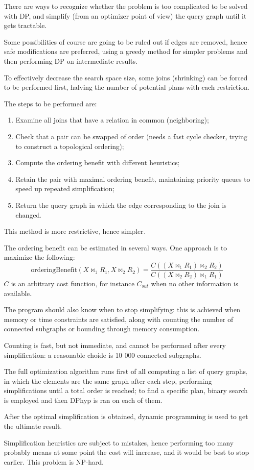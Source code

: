 There are ways to recognize whether the problem is too complicated to be solved with DP, and simplify (from an optimizer point of view) the query graph until it gets tractable. 

Some possibilities of course are going to be ruled out if edges are removed, hence safe modifications are preferred, using a greedy method for simpler problems and then performing DP on intermediate results. 

To effectively decrease the search space size, some joins (shrinking) can be forced to be performed first, halving the number of potential plans with each restriction. 

The steps to be performed are:
\begin{enumerate}
	\item Examine all joins that have a relation in common (neighboring);
	\item Check that a pair can be swapped of order (needs a fast cycle checker, trying to construct a topological ordering);
	\item Compute the ordering benefit with different heuristics;
	\item Retain the pair with maximal ordering benefit, maintaining priority queues to speed up repeated simplification;
	\item Return the query graph in which the edge corresponding to the join is changed.
\end{enumerate}
This method is more restrictive, hence simpler. 

The ordering benefit can be estimated in several ways. One approach is to maximize the following:
$$\text{orderingBenefit}(X \bowtie_1 R_1, X \bowtie_2 R_2) = \frac{C((X \bowtie_1 R_1) \bowtie_2 R_2)}{C((X \bowtie_2 R_2) \bowtie_1 R_1)}$$
$C$ is an arbitrary cost function, for instance $C_{out}$ when no other information is available.

The program should also know when to stop simplifying: this is achieved when memory or time constraints are satisfied, along with counting the number of connected subgraphs or bounding through memory consumption.

Counting is fast, but not immediate, and cannot be performed after every simplification: a reasonable choide is 10 000 connected subgraphs.

The full optimization algorithm runs first of all computing a list of query graphs, in which the elements are the same graph after each step, performing simplifications until a total order is reached; to find a specific plan, binary search is employed and then DPhyp is ran on each of them.

After the optimal simplification is obtained, dynamic programming is used to get the ultimate result.

Simplification heuristics are subject to mistakes, hence performing too many probably means at some point the cost will increase, and it would be best to stop earlier. This problem is NP-hard.
